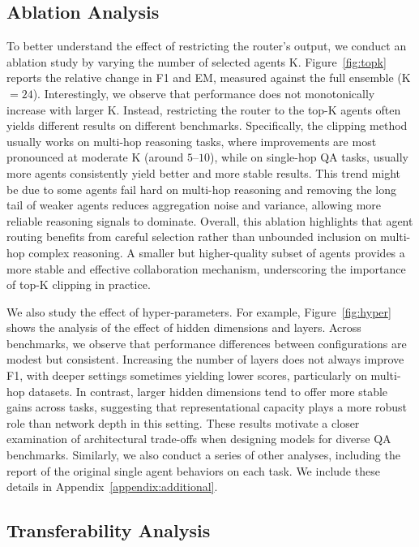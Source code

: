 \documentclass[11pt]{article}
\begin{document}
\subsection{Ablation Analysis}

To better understand the effect of restricting the router’s output, we conduct an ablation study by varying the number of selected agents K. Figure~\ref{fig:topk} reports the relative change in F1 and EM, measured against the full ensemble (K${=}24$). Interestingly, we observe that performance does not monotonically increase with larger K. Instead, restricting the router to the top-K agents often yields different results on different benchmarks. Specifically, the clipping method usually works on multi-hop reasoning tasks, where improvements are most pronounced at moderate K (around $5$–$10$), while on single-hop QA tasks, usually more agents consistently yield better and more stable results. This trend might be due to some agents fail hard on multi-hop reasoning and removing the long tail of weaker agents reduces aggregation noise and variance, allowing more reliable reasoning signals to dominate. Overall, this ablation highlights that agent routing benefits from careful selection rather than unbounded inclusion on multi-hop complex reasoning. A smaller but higher-quality subset of agents provides a more stable and effective collaboration mechanism, underscoring the importance of top-K clipping in practice. 

We also study the effect of hyper-parameters. For example, Figure~\ref{fig:hyper} shows the analysis of the effect of hidden dimensions and layers. Across benchmarks, we observe that performance differences between configurations are modest but consistent. Increasing the number of layers does not always improve F1, with deeper settings sometimes yielding lower scores, particularly on multi-hop datasets. In contrast, larger hidden dimensions tend to offer more stable gains across tasks, suggesting that representational capacity plays a more robust role than network depth in this setting. These results motivate a closer examination of architectural trade-offs when designing models for diverse QA benchmarks. Similarly, we also conduct a series of other analyses, including the report of the original single agent behaviors on each task. We include these details in Appendix~\ref{appendix:additional}.

\subsection{Transferability Analysis}
\end{document}
